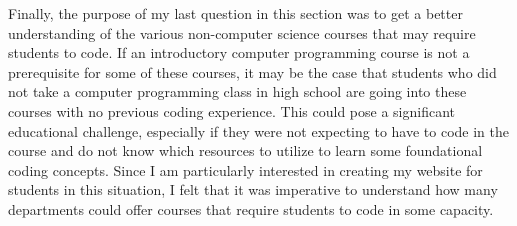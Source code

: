 \documentclass[10pt,twocolumn]{article}
\begin{document}
Finally, the purpose of my last question in this section was to get a better understanding of the various non-computer science courses that may require students to code. If an introductory computer programming course is not a prerequisite for some of these courses, it may be the case that students who did not take a computer programming class in high school are going into these courses with no previous coding experience. This could pose a significant educational challenge, especially if they were not expecting to have to code in the course and do not know which resources to utilize to learn some foundational coding concepts. Since I am particularly interested in creating my website for students in this situation, I felt that it was imperative to understand how many departments could offer courses that require students to code in some capacity.
\end{document}

